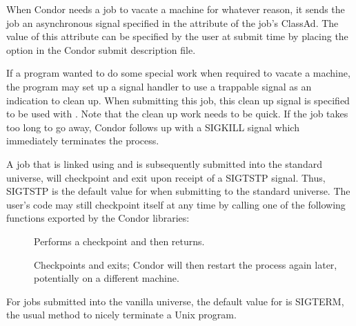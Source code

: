 When Condor needs a job to vacate a machine for whatever reason, it
sends the job an asynchronous signal specified in the 
attribute of the job's ClassAd.
The value of this attribute can be specified by
the user at submit time by placing the  option in the
Condor submit description file.  

If a program wanted to do some special work when required
to vacate a machine, the program may set up a
signal handler to use a trappable signal as an indication
to clean up.
When submitting this job, this clean up signal is specified to be used with
.
Note that the clean up work needs to be quick.
If the job takes too long to go away, Condor
follows up with a SIGKILL signal which immediately terminates the
process.

A job that is linked using 
and is subsequently submitted into the standard universe, 
will checkpoint and exit upon receipt of a SIGTSTP signal.
Thus, SIGTSTP is
the default value for  when submitting to the standard
universe.
The user's code may still checkpoint itself at any time
by calling one of the following functions exported by the Condor libraries:
\begin{description}
\item[] Performs a checkpoint and then returns.
\item[] Checkpoints and exits; Condor will then
restart the process again later, potentially on a different machine.
\end{description}

For jobs submitted into the vanilla universe, the default value for
 is SIGTERM,
the usual method to nicely terminate a Unix program.









